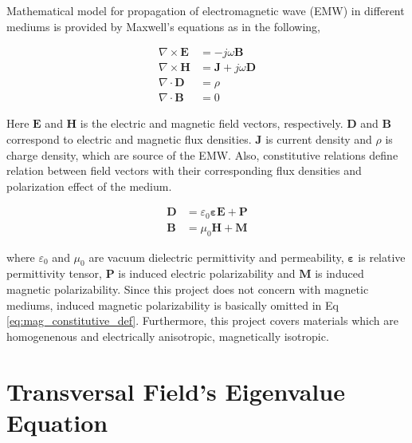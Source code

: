 \documentclass[thesis]{deutez}
\begin{document}
    Mathematical model for propagation of electromagnetic wave (EMW) in different mediums is provided by Maxwell's equations as in the following,


    \begin{subequations}\label{eq:maxwell_def}
        \begin{align}
            \nabla \times \mathbf{E} &= -j\omega \mathbf{B} \label{eq:maxwell_def_a} \\
            \nabla \times \mathbf{H} &= \mathbf{J} + j\omega \mathbf{D} \label{eq:maxwell_def_b} \\
            \nabla \cdot \mathbf{D} &= \rho \label{eq:maxwell_def_c} \\
            \nabla \cdot \mathbf{B} &= 0 \label{eq:maxwell_def_d}
        \end{align}
    \end{subequations}

    Here $\mathbf{E}$ and $\mathbf{H}$ is the electric and magnetic field vectors, respectively. $\mathbf{D}$ and $\mathbf{B}$ correspond to electric and magnetic flux densities. $\mathbf{J}$ is current density and $\rho$ is charge density, which are source of the EMW. Also, constitutive relations define relation between field vectors with their corresponding flux densities and polarization effect of the medium.  

    \begin{align}
        \mathbf{D} &= \varepsilon_0 \bm{\varepsilon} \mathbf{E} + \mathbf{P} \label{eq:el_constitutive_def}\\
        \mathbf{B} &= \mu_0  \mathbf{H} + \mathbf{M}
       \label{eq:mag_constitutive_def} 
    \end{align}

    
    where $\varepsilon_0$ and $\mu_0$ are vacuum dielectric permittivity and permeability, $\bm{\varepsilon}$ is relative permittivity tensor, $\mathbf{P}$ is induced electric polarizability and $\mathbf{M}$ is induced magnetic polarizability. Since this project does not concern with magnetic mediums, induced magnetic polarizability is basically omitted in Eq \ref{eq:mag_constitutive_def}. Furthermore, this project covers materials which are homogenenous and electrically anisotropic, magnetically isotropic.    
    
    \section{Transversal Field's Eigenvalue Equation}
\end{document}
